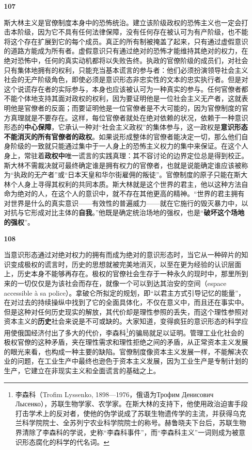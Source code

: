 \documentclass[fontset=fandol, a4paper, 12pt, openright]{ctexbook}
\makeatletter
\newcommand{\thesis}[1]{%
    \par\vspace{1.5em}%
    {\centering \textbf{\Large #1}\par}%
    \nobreak\vspace{0.5em}\nobreak
    \@afterindenttrue %
    \@afterheading    %
}
\makeatother
\begin{document}
\thesis{107}
斯大林主义是官僚制度本身中的恐怖统治。建立该阶级政权的恐怖主义也一定会打击本阶级，因为它不具有任何法律保障，没有任何存在被认可为有产阶级，也不能将这个存在扩展到它的每个成员。真正的所有制被掩盖了起来，只有通过虚假意识的道路方能成为所有者。虚假意识只有通过绝对的恐怖才能维持其绝对的权力，在绝对恐怖中，任何的真实动机都将以失败告终。执政的官僚阶级的成员们，对社会只有集体地拥有的权利，只能充当基本谎言的参与者：他们必须扮演领导社会主义社会的无产阶级角色，即使必须是意识形态非忠实性的文本的忠实执行者。但是对这个说谎存在者的实际参与，本身也应该被认可为一种真实的参与。任何官僚者都不能个体地支持其面对政权的权利，因为要证明他是一位社会主义无产者，这就表明他是官僚者的反面；而要证明他是一位官僚者是不大可能的，因为官僚制度的官方真理就是不要存在。这样，每位官僚者就处在绝对依赖的状况，依赖于一种意识形态的\textbf{中心保障}，它承认一种对“社会主义政权”的集体参与，这一政权是\textbf{意识形态不能消灭的所有官僚者的政权}。如果说形成整体的官僚者能决定一切，那么他们自身阶级的一致就只能通过集中于一人身上的恐怖主义权力的集中来保证。在这个人身上，常驻着\textbf{政权中}唯一谎言的实践真理：其不容讨论的边界定位总是得到校正。斯大林不需裁决就可最终确定谁是拥有权力的官僚者，也就是说能确定谁应该被称为“执政的无产者”或“日本天皇和华尔街雇佣的叛徒”。官僚制度的原子只能在斯大林个人身上寻得其权利的共同本质。斯大林就是这个世界的君主，他以这种方法自命为绝对的人，在这个人的意识中，就不存在其他更高的精神。“世界的君主拥有对世界是什么的真实意识——有效性的普遍威力——就在它施行的毁灭暴力中，以对抗与它形成对比主体的\textbf{自我}。”他既是确定统治场地的强权，也是“\textbf{破坏这个场地的强权}”。

\thesis{108}
当意识形态通过对绝对权力的拥有而成为绝对的意识形态时，当它从一种碎片的知识变成极权的谎言时，历史的思想就被完美地消灭，以至在更为经验的认识层面上，历史本身不能够再存在。极权的官僚社会生存于一种永久的现时中，那里所到来的一切仅仅是为该社会而存在，就像一个可以到达其治安的空间（espace accessible à sa police）。拿破仑所拟定的规划，即“以君主方式引导记忆的能量”，在对过去的持续操纵中找到了它的全面具体化，不仅在意义中，而且还在事实中。但是这种对任何历史现实的解放，其代价却是理性参照的丢失，而这个理性参照对资本主义的\textbf{历史}社会来说是不可或缺的。大家知道，变得疯狂的意识形态的科学应用使俄国经济付出了多大的代价，李森科\footnote{李森科（Trofim Lyssenko, 1898—1976，俄语为Трофим Денисович Лысенко），苏联生物学家、农学家。在斯大林的支持下，他使用政治迫害手段打击学术上的反对者，使他的伪学说成了苏联生物遗传学的主流，并获得乌克兰科学院院士、全苏列宁农业科学院院士的称号。赫鲁晓夫下台后，苏联生物界清除了李森科的学说，史称“李森科事件”，而“李森科主义”一词则成为被意识形态腐化的科学的代名词。}的骗局就足以证明。管理工业化社会的极权官僚的这种矛盾，夹在理性需求和理性拒绝之间的矛盾，从正常资本主义发展的眼光来看，也构成一种主要的缺陷。官僚制度像资本主义发展一样，不能解决农业的问题，在工业生产中最终也逊色于资本主义发展，因为工业生产是专制计划的生产，它建立在非现实主义和全面谎言的基础之上。
\end{document}
